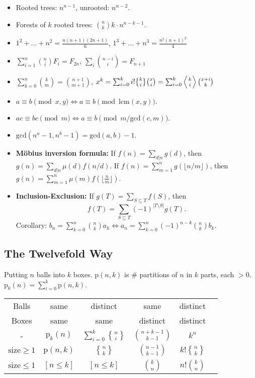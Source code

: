 \documentclass[8pt,a4paper,landscape,oneside]{amsart}
\DeclareRobustCommand{\stirling}{\genfrac\{\}{0pt}{}}
\begin{document}
\begin{multicols*}{3}
\begin{itemize}[wide,labelwidth=!,labelindent=0pt]
	\item Rooted trees: $n^{n-1}$, unrooted: $n^{n-2}$.
	\item Forests of $k$ rooted trees: $\binom{n}{k} k \cdot n^{n-k-1}$.
	\item $1^2 + \dots + n^2 = \frac{n(n+1)(2n+1)}{6}$, \quad $1^3 + \dots + n^3 = \frac{n^2(n+1)^2}{4}$ \\
	\item $\sum_{i=1}^n \binom{n}{i} F_i = F_{2n}$, \quad $\sum_{i} \binom{n-i}{i} = F_{n+1}$
	\item $\sum_{k=0}^n \binom{k}{m} = \binom{n+1}{m+1}$, \quad $x^k = \sum_{i=0}^k i!\stirling{k}{i}\binom{x}{i} = \sum_{i=0}^k \left\langle {k \atop i} \right\rangle\binom{x+i}{k}$
	\item $a\equiv b \pmod{x,y} \Leftrightarrow a \equiv b \pmod{\mathrm{lcm}(x,y)}$.
	\item $ac \equiv bc \pmod{m} \Leftrightarrow a \equiv b \pmod{m/\mathrm{gcd}(c,m)}$.
	\item $\mathrm{gcd}(n^a-1,n^b-1) = \mathrm{gcd}(a,b)-1$.
	\item \textbf{Möbius inversion formula:} If $f(n) = \sum_{d|n} g(d)$, then $g(n) = \sum_{d|n} \mu(d) f(n/d)$. If $f(n) = \sum_{m=1}^n g(\lfloor n/m\rfloor)$, then $g(n) = \sum_{m=1}^n \mu(m)f(\lfloor\frac{n}{m}\rfloor)$.
	\item \textbf{Inclusion-Exclusion:} If $g(T) = \sum_{S \subseteq T} f(S)$, then
	\[
		f(T) = \sum_{S \subseteq T} (-1)^{\lvert T \setminus S \rvert} g(T).
	\]
	Corollary:
		$b_n = \sum_{k=0}^{n} \binom{n}{k} a_k \Longleftrightarrow a_n = \sum_{k=0}^{n} (-1)^{n-k} \binom{n}{k} b_k$.
\end{itemize}

\subsection{The Twelvefold Way}
Putting $n$ balls into $k$ boxes.
$\mathrm{p}(n,k)$ is \# partitions of $n$ in $k$ parts, each $>0$.
$\mathrm{p}_k(n) = \sum_{i=0}^k \mathrm{p}(n,k)$.

\begin{tabular}{@{}c|c|c|c|c|l@{}}
	Balls & same & distinct & same & distinct\\
	Boxes & same & same & distinct & distinct\\
	\hline
	- & $\mathrm{p}_k(n)$ & $\sum_{i=0}^k \stirling{n}{i}$ & $\binom{n+k-1}{k-1}$ & $k^n$ \\
	$\mathrm{size}\ge 1$ & $\mathrm{p}(n,k)$ & $\stirling{n}{k}$ & $\binom{n-1}{k-1}$ & $k!\stirling{n}{k}$ \\
	$\mathrm{size}\le 1$ & $[n \le k]$ & $[n \le k]$ & $\binom{k}{n}$ & $n!\binom{k}{n}$ \\
	\bottomrule
\end{tabular}


\end{multicols*}
\end{document}
